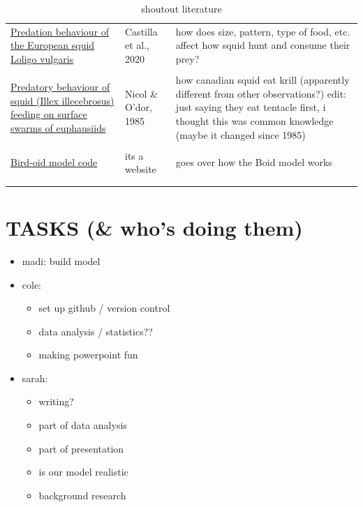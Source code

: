 \documentclass[12pt]{article}
\begin{document}
\begin{longtable}{p{2.0in}|p{1.0in}|p{2.5in}}
        \href{https://link.springer.com/article/10.1007/s10164-020-00652-4}{Predation behaviour of the European squid Loligo vulgaris} & Castilla et al., 2020 & how does size, pattern, type of food, etc. affect how squid hunt and consume their prey? \\ \\

        \href{https://cdnsciencepub.com/doi/abs/10.1139/z85-003?casa_token=bqmjjmJ0cKEAAAAA:WwqN4ggP8UB-tploMwL8HRw3yJYGMCQLuByca4VsFl7IuEsnIVroR8C_c-qpgDbPYlPSr6QztWM}{Predatory behaviour of squid (Illex illecebrosus) feeding on surface swarms of euphausiids} & Nicol \& O'dor, 1985 & how canadian squid eat krill (apparently different from other observations?) edit: just saying they eat tentacle first, i thought this was common knowledge (maybe it changed since 1985) \\ \\

        \href{https://github-pages.ucl.ac.uk/rsd-engineeringcourse/ch02data/084Boids.html}{Bird-oid model code} & its a website & goes over how the Boid model works\\\\
    
    \caption{shoutout literature}
\end{longtable}


\section{TASKS (\& who's doing them)}
\begin{itemize}
    \item madi: build model
    \item cole:
    \begin{itemize}
        \item set up github / version control
        \item data analysis / statistics??
        \item making powerpoint fun
    \end{itemize}
    \item sarah: 
        \begin{itemize}
            \item writing?
            \item part of data analysis
            \item part of presentation
            \item is our model realistic
            \item background research
        \end{itemize}
        
\end{itemize}
\end{document}

